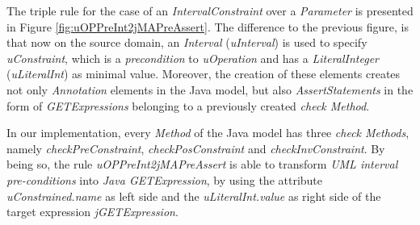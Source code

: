 \documentclass[tuberlin,cic,tc,english,noabntcite, oneside]{iiufrgs}
\begin{document}
The triple rule for the case of an \emph{IntervalConstraint} over a \emph{Parameter} is presented in Figure \ref{fig:uOPPreInt2jMAPreAssert}. The difference to the previous figure, is that now on the source domain, an \emph{Interval} (\emph{uInterval}) is used to specify \emph{uConstraint}, which is a \emph{precondition} to \emph{uOperation} and has a \emph{LiteralInteger} (\emph{uLiteralInt}) as minimal value. Moreover, the creation of these elements creates not only \emph{Annotation} elements in the Java model, but also \emph{AssertStatements} in the form of \emph{GETExpressions} belonging to a previously created \emph{check Method}. 

In our implementation, every \emph{Method} of the Java model has three \emph{check Methods}, namely \emph{checkPreConstraint}, \emph{checkPosConstraint} and \emph{checkInvConstraint}. By being so, the rule \emph{uOPPreInt2jMAPreAssert} is able to transform \emph{UML interval pre-conditions} into \emph{Java GETExpression}, by using the attribute \emph{uConstrained.name} as left side and the \emph{uLiteralInt.value} as right side of the target expression \emph{jGETExpression}.
\end{document}
